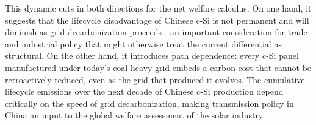 \documentclass{article}
\begin{document}
This dynamic cuts in both directions for the net welfare calculus. On one hand, it suggests that the lifecycle disadvantage of Chinese c-Si is not permanent and will diminish as grid decarbonization proceeds---an important consideration for trade and industrial policy that might otherwise treat the current differential as structural. On the other hand, it introduces path dependence: every c-Si panel manufactured under today's coal-heavy grid embeds a carbon cost that cannot be retroactively reduced, even as the grid that produced it evolves. The cumulative lifecycle emissions over the next decade of Chinese c-Si production depend critically on the speed of grid decarbonization, making transmission policy in China an input to the global welfare assessment of the solar industry.



\end{document}
